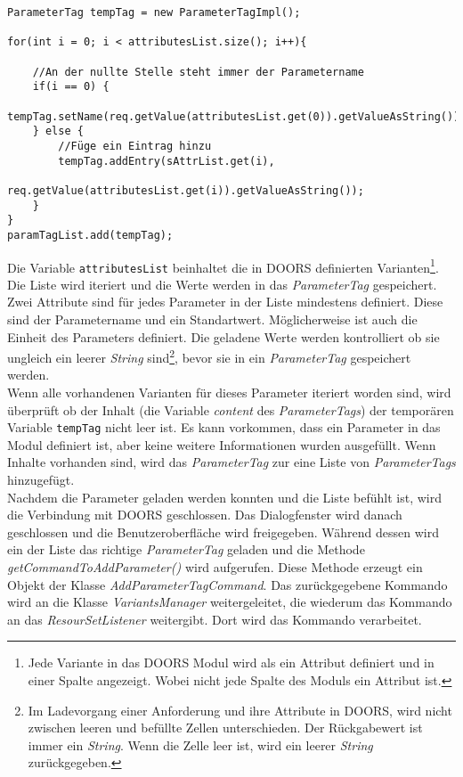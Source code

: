 \begin{lstlisting}[caption={Auszug von der Erstellung der ParameterTags}, captionpos=b,label={lst:CreateParamTag}]
ParameterTag tempTag = new ParameterTagImpl();
		
for(int i = 0; i < attributesList.size(); i++){
	
	//An der nullte Stelle steht immer der Parametername
	if(i == 0) {
		tempTag.setName(req.getValue(attributesList.get(0)).getValueAsString());
	} else {
		//Füge ein Eintrag hinzu 
		tempTag.addEntry(sAttrList.get(i),
				req.getValue(attributesList.get(i)).getValueAsString());
	}
}
paramTagList.add(tempTag);
\end{lstlisting}


Die Variable \texttt{attributesList} beinhaltet die in DOORS definierten Varianten\footnote{Jede Variante in das DOORS Modul wird als ein Attribut definiert und in einer Spalte angezeigt. Wobei nicht jede Spalte des Moduls ein Attribut ist.}. Die Liste wird iteriert und die Werte werden in das \textit{ParameterTag} gespeichert. Zwei Attribute sind für jedes Parameter in der Liste mindestens definiert. Diese sind der Parametername und ein Standartwert. Möglicherweise ist auch die Einheit des Parameters definiert. Die geladene Werte werden kontrolliert ob sie ungleich ein leerer \textit{String} sind\footnote{Im Ladevorgang einer Anforderung und ihre Attribute in DOORS, wird nicht zwischen leeren und befüllte Zellen unterschieden. Der Rückgabewert ist immer ein \textit{String}. Wenn die Zelle leer ist, wird ein leerer \textit{String} zurückgegeben.}, bevor sie in ein \textit{ParameterTag} gespeichert werden.\\


Wenn alle vorhandenen Varianten für dieses Parameter iteriert worden sind, wird überprüft ob der Inhalt (die Variable \textit{content} des \textit{ParameterTags}) der temporären Variable \texttt{tempTag} nicht leer ist. Es kann vorkommen, dass ein Parameter in das Modul definiert ist, aber keine weitere Informationen wurden ausgefüllt. Wenn Inhalte vorhanden sind, wird das \textit{ParameterTag} zur eine Liste von \textit{ParameterTags} hinzugefügt.\\

Nachdem die Parameter geladen werden konnten und die Liste befühlt ist, wird die Verbindung mit DOORS geschlossen. Das Dialogfenster wird danach geschlossen und die Benutzeroberfläche wird freigegeben. Während dessen wird ein der Liste das richtige \textit{ParameterTag} geladen und die Methode \textit{getCommandToAddParameter()} wird aufgerufen. Diese Methode erzeugt ein Objekt der Klasse \textit{AddParameterTagCommand}. Das zurückgegebene Kommando wird an die Klasse \textit{VariantsManager} weitergeleitet, die wiederum das Kommando an das \textit{ResourSetListener} weitergibt. Dort wird das Kommando verarbeitet.\\



